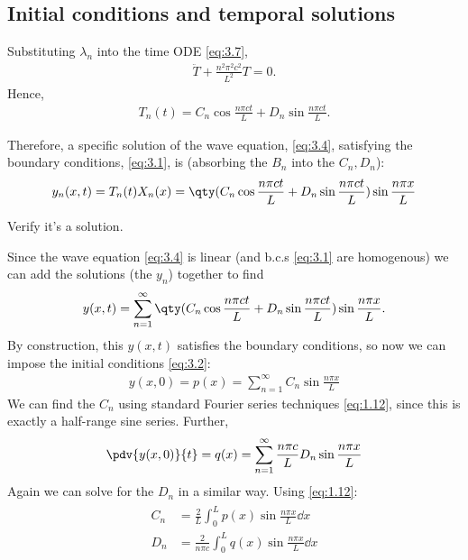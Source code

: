 \subsection{Initial conditions and temporal solutions}
Substituting $\lambda_n$ into the time ODE \cref{eq:3.7},
\begin{align*}
	\ddot T + \frac{n^2 \pi^2 c^2}{L^2}T = 0.
\end{align*}
Hence,
\begin{align} \label{eq:3.9}
	T_n(t) = C_n \cos \frac{n \pi c t}{L} + D_n \sin \frac{n \pi c t}{L}.
\end{align}

Therefore, a specific solution of the wave equation, \cref{eq:3.4}, satisfying the boundary conditions, \cref{eq:3.1}, is (absorbing the $B_n$ into the $C_n, D_n$):
\begin{align*}
	y_n(x,t) = T_n(t) X_n(x) = \qty(C_n \cos \frac{n \pi c t}{L} + D_n \sin \frac{n \pi c t}{L}) \sin \frac{n \pi x}{L}
\end{align*}

\begin{exercise}
	Verify it's a solution.
\end{exercise} 

Since the wave equation \cref{eq:3.4} is linear (and b.c.s \cref{eq:3.1} are homogenous) we can add the solutions (the $y_n$) together to find 
\begin{align} \label{eq:3.10}
	y(x,t) = \sum_{n=1}^\infty \qty(C_n \cos \frac{n \pi c t}{L} + D_n \sin \frac{n \pi c t}{L}) \sin \frac{n \pi x}{L}.
\end{align}
By construction, this $y(x,t)$ satisfies the boundary conditions, so now we can impose the initial conditions \cref{eq:3.2}:
\begin{align*}
	y(x,0) = p(x) = \sum_{n=1}^\infty C_n \sin \frac{n \pi x}{L}
\end{align*}
We can find the $C_n$ using standard Fourier series techniques \cref{eq:1.12}, since this is exactly a half-range sine series.
Further,
\begin{align*}
	\pdv{y(x,0)}{t} = q(x) = \sum_{n=1}^\infty \frac{n \pi c}{L} D_n \sin \frac{n \pi x}{L}
\end{align*}
Again we can solve for the $D_n$ in a similar way.
Using \cref{eq:1.12}:
\begin{align}
	\begin{aligned} \label{eq:3.11}
		C_n &= \frac{2}{L} \int_0^L p(x) \sin \frac{n \pi x}{L} \dd{x} \\
		D_n &= \frac{2}{n \pi c} \int_0^L q(x) \sin \frac{n \pi x}{L} \dd{x}
	\end{aligned}
\end{align} 

